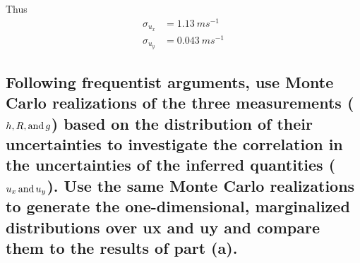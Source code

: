 \documentclass[paper=letter, fontsize=11pt]{scrartcl} %
\begin{document}
Thus
\begin{align}
  \sigma_{u_{x}} &= \SI{1.13}{ms^{-1}}\\
  \sigma_{u_{y}} &=\SI{0.043}{ms^{-1}}
\end{align}

\subsection{Following frequentist arguments, use Monte Carlo
  realizations of the three measurements ($h, R, \hbox{and}\,g$) based
  on the distribution of their uncertainties to investigate the
  correlation in the uncertainties of the inferred quantities
  ($u_{x}\, \hbox{and}\, u_{y}$). Use the same Monte Carlo realizations to
  generate the one-dimensional, marginalized distributions over ux and
  uy and compare them to the results of part (a).}
\end{document}
